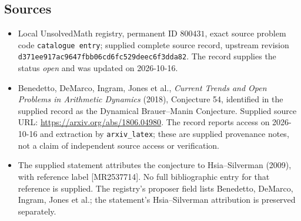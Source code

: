 \documentclass[11pt]{article}
\begin{document}
\subsection{Sources}
\begin{itemize}
\item Local UnsolvedMath registry, permanent ID \(800431\), exact source problem code \texttt{catalogue entry}; supplied complete source record, upstream revision \texttt{d371ee917ac9647fbb06cd6fc529deec6f3dda82}. The record supplies the status \emph{open} and was updated on 2026-10-16.
\item Benedetto, DeMarco, Ingram, Jones et al., \emph{Current Trends and Open Problems in Arithmetic Dynamics} (2018), Conjecture 54, identified in the supplied record as the Dynamical Brauer--Manin Conjecture. Supplied source URL: \url{https://arxiv.org/abs/1806.04980}. The record reports access on 2026-10-16 and extraction by \texttt{arxiv\_latex}; these are supplied provenance notes, not a claim of independent source access or verification.
\item The supplied statement attributes the conjecture to Hsia--Silverman (2009), with reference label [MR2537714]. No full bibliographic entry for that reference is supplied. The registry's proposer field lists Benedetto, DeMarco, Ingram, Jones et al.; the statement's Hsia--Silverman attribution is preserved separately.
\end{itemize}
\end{document}
